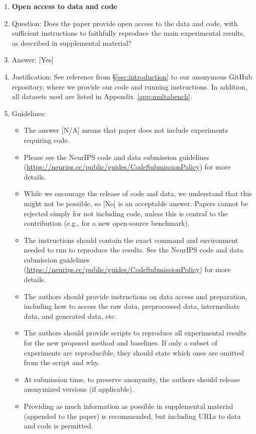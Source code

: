 \documentclass{llmxive}
\providecommand{\answerYes}[1][]{[Yes]#1}
\providecommand{\answerNo}[1][]{[No]#1}
\providecommand{\answerNA}[1][]{[N/A]#1}
\begin{document}
\begin{enumerate}
\item {\bf Open access to data and code}
    \item[] Question: Does the paper provide open access to the data and code, with sufficient instructions to faithfully reproduce the main experimental results, as described in supplemental material?
    \item[] Answer: \answerYes{}
    \item[] Justification: See reference from \S\ref{sec:introduction} to our anonymous GitHub repository, where we provide
our code and running instructions. In addition, all datasets used are listed in Appendix~\ref{app:multabench}.
    \item[] Guidelines:
    \begin{itemize}
        \item The answer \answerNA{} means that paper does not include experiments requiring code.
        \item Please see the NeurIPS code and data submission guidelines (\url{https://neurips.cc/public/guides/CodeSubmissionPolicy}) for more details.
        \item While we encourage the release of code and data, we understand that this might not be possible, so \answerNo{} is an acceptable answer. Papers cannot be rejected simply for not including code, unless this is central to the contribution (e.g., for a new open-source benchmark).
        \item The instructions should contain the exact command and environment needed to run to reproduce the results. See the NeurIPS code and data submission guidelines (\url{https://neurips.cc/public/guides/CodeSubmissionPolicy}) for more details.
        \item The authors should provide instructions on data access and preparation, including how to access the raw data, preprocessed data, intermediate data, and generated data, etc.
        \item The authors should provide scripts to reproduce all experimental results for the new proposed method and baselines. If only a subset of experiments are reproducible, they should state which ones are omitted from the script and why.
        \item At submission time, to preserve anonymity, the authors should release anonymized versions (if applicable).
        \item Providing as much information as possible in supplemental material (appended to the paper) is recommended, but including URLs to data and code is permitted.
    \end{itemize}



\end{enumerate}
\end{document}
